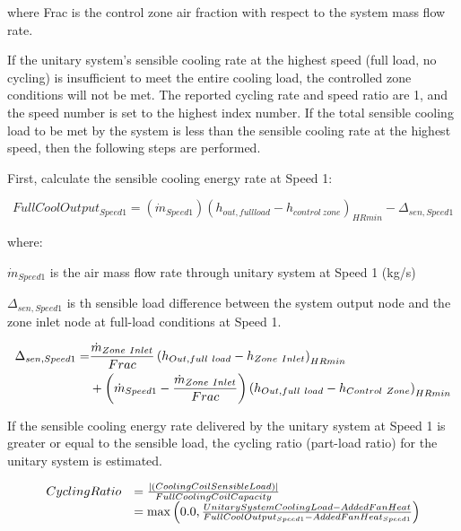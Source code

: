 where Frac is the control zone air fraction with respect to the system mass flow rate.

If the unitary system's sensible cooling rate at the highest speed (full load, no cycling) is insufficient to meet the entire cooling load, the controlled zone conditions will not be met. The reported cycling rate and speed ratio are 1, and the speed number is set to the highest index number. If the total sensible cooling load to be met by the system is less than the sensible cooling rate at the highest speed, then the following steps are performed.

First, calculate the sensible cooling energy rate at Speed 1:

\begin{equation}
FullCoolOutpu{t_{Speed1}} = ({\dot m_{Speed1}}){({h_{out,fullload}} - {h_{control~zone}})_{HRmin}} - {\Delta_{sen,Speed1}}
\end{equation}

where:

\emph{\({\dot m_{Speed1}}\)} is the air mass flow rate through unitary system at Speed 1 (kg/s)

\(\Delta_{sen,Speed1}\) is th sensible load difference between the system output node and the zone inlet node at full-load conditions at Speed 1.

\begin{equation}
  \begin{split}
    \Delta_{sen,Speed1} =& \frac{\dot{m}_{Zone~Inlet}}{Frac} \left(h_{Out,full~load} - h_{Zone~Inlet}\right)_{HRmin} \\
                              &+ \left(\dot{m}_{Speed1} - \frac{\dot{m}_{Zone~Inlet}}{Frac}\right) \left(h_{Out,full~load} - h_{Control~Zone}\right)_{HRmin}
  \end{split}
\end{equation}

If the sensible cooling energy rate delivered by the unitary system at Speed 1 is greater or equal to the sensible load, the cycling ratio (part-load ratio) for the unitary system is estimated.

\begin{equation}
  \begin{array}{rl}
    CyclingRatio &= \frac{ \left| \left(CoolingCoilSensibleLoad\right) \right| } {FullCoolingCoilCapacity} \\ 
                 &= \max \left(0.0,\frac{UnitarySystemCoolingLoad - AddedFanHeat}{FullCoolOutput_{Speed1} - AddedFanHeat_{Speed1}}\right)
  \end{array}
\end{equation}

